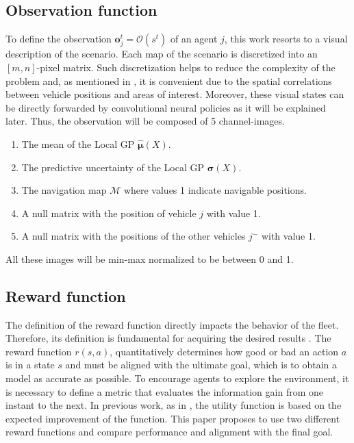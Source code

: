 \documentclass[journal]{IEEEtran}
\newcommand\vect[1]{\boldsymbol{#1}}
\begin{document}
\subsection{Observation function}


To define the observation $\vect{o}_j^t = \mathcal{O}(s^t)$ of an agent $j$, this work resorts to a visual description of the scenario. Each map of the scenario is discretized into an $[m,n]$-pixel matrix. Such discretization helps to reduce the complexity of the problem and, as mentioned in \cite{yanes_deep_2020}, it is convenient due to the spatial correlations between vehicle positions and areas of interest. Moreover, these visual states can be directly forwarded by convolutional neural policies as it will be explained later. Thus, the observation will be composed of 5 channel-images. %

\begin{enumerate}
    \item The mean of the Local GP $\vect{\hat \mu}(X)$. %
    \item The predictive uncertainty of the Local GP $\vect{\sigma}(X)$. %
    \item The navigation map $\mathcal{M}$ where values 1 indicate navigable positions.%
    \item A null matrix with the position of vehicle $j$ with value 1.%
    \item A null matrix with the positions of the other vehicles $j^-$ with value 1.%
\end{enumerate}

All these images will be min-max normalized to be between 0 and 1.

\subsection{Reward function}

The definition of the reward function directly impacts the behavior of the fleet. Therefore, its definition is fundamental for acquiring the desired results \cite{sutton_reinforcement_2018}. The reward function $r(s,a)$, quantitatively determines how good or bad an action $a$ is in a state $s$ and must be aligned with the ultimate goal, which is to obtain a model as accurate as possible. 
To encourage agents to explore the environment, it is necessary to define a metric that evaluates the information gain from one instant to the next. In previous work, as in \cite{peralta_MULTIOBJECTIVE}, the utility function is based on the expected improvement of the function. This paper proposes to use two different reward functions and compare performance and alignment with the final goal.
\end{document}
